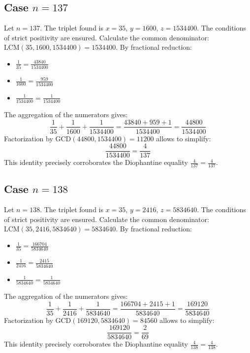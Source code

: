 \documentclass[11pt,a4paper]{article}
\begin{document}
\subsection{Case $n = 137$}
Let $n = 137$. The triplet found is $x = 35$, $y = 1600$, $z = 1534400$.
The conditions of strict positivity are ensured.
Calculate the common denominator: $\text{LCM}(35, 1600, 1534400) = 1534400$.
By fractional reduction:
\begin{itemize}
    \item $\frac{1}{35} = \frac{43840}{1534400}$
    \item $\frac{1}{1600} = \frac{959}{1534400}$
    \item $\frac{1}{1534400} = \frac{1}{1534400}$
\end{itemize}
The aggregation of the numerators gives:
$$ \frac{1}{35} + \frac{1}{1600} + \frac{1}{1534400} = \frac{43840 + 959 + 1}{1534400} = \frac{44800}{1534400} $$
Factorization by $\text{GCD}(44800, 1534400) = 11200$ allows to simplify:
$$ \frac{44800}{1534400} = \frac{4}{137} $$
This identity precisely corroborates the Diophantine equality $\frac{4}{137} = \frac{4}{137}$.

\subsection{Case $n = 138$}
Let $n = 138$. The triplet found is $x = 35$, $y = 2416$, $z = 5834640$.
The conditions of strict positivity are ensured.
Calculate the common denominator: $\text{LCM}(35, 2416, 5834640) = 5834640$.
By fractional reduction:
\begin{itemize}
    \item $\frac{1}{35} = \frac{166704}{5834640}$
    \item $\frac{1}{2416} = \frac{2415}{5834640}$
    \item $\frac{1}{5834640} = \frac{1}{5834640}$
\end{itemize}
The aggregation of the numerators gives:
$$ \frac{1}{35} + \frac{1}{2416} + \frac{1}{5834640} = \frac{166704 + 2415 + 1}{5834640} = \frac{169120}{5834640} $$
Factorization by $\text{GCD}(169120, 5834640) = 84560$ allows to simplify:
$$ \frac{169120}{5834640} = \frac{2}{69} $$
This identity precisely corroborates the Diophantine equality $\frac{4}{138} = \frac{4}{138}$.
\end{document}

